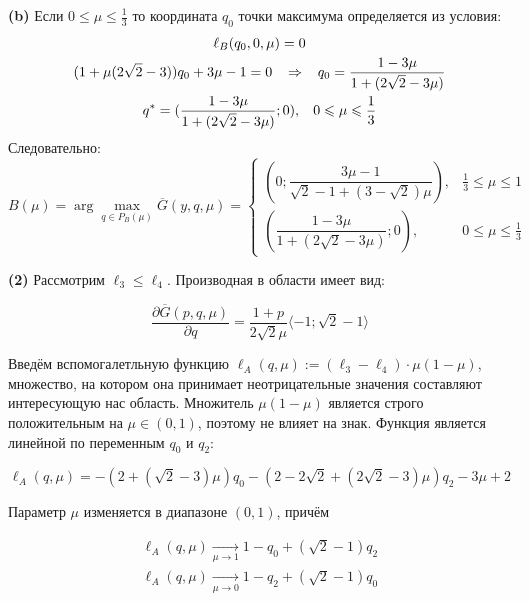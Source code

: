 \textbf{(b)}
Если $0 \leqslant \mu \leqslant \frac{1}{3}$ то координата $q_0$ точки 
максимума определяется из условия: 	
\begin{gather*}
	\ell_B(q_0,0,\mu)=0
	\\	
	(1+\mu(2\sqrt{2}-3))q_0
	+3\mu-1=0
	\hspace{3mm} \Rightarrow \hspace{3mm}
	q_0=\frac{1-3\mu}{1+(2\sqrt{2}-3\mu)}	
	\\ 	
	q^*=(\frac{1-3\mu}{1+(2\sqrt{2}-3\mu)}; 0), \hspace{3mm}
	0 \leqslant \mu \leqslant \frac{1}{3}
\end{gather*}
Следовательно:
\begin{equation} 
	\label{eq:B_point}
	B(\mu) = \arg \max \limits_{q\in P_B(\mu)} \overline G(y,q,\mu) = 
	\begin{cases}
		(0;\dfrac{3\mu-1}{\sqrt{2}-1+(3-\sqrt{2})\mu})
		, & \frac{1}{3} \leqslant \mu \leqslant 1
		\\
		(\dfrac{1-3\mu}{1+(2\sqrt{2}-3\mu)};0)
		, & 0 \leqslant \mu \leqslant \frac{1}{3}
	\end{cases}
\end{equation}


\textbf{(2)} Рассмотрим $\ell_3 \leqslant \ell_4$.
Производная в области имеет вид:
	
$$
	\frac{\partial \overline{G}(p,q,\mu)}{\partial q}=
	\frac{1+p}{2\sqrt{2}\mu} \langle -1;\sqrt{2}-1 \rangle 
$$
 	
Введём вспомогалетльную функцию	
$\ell_A(q, \mu):=(\ell_3-\ell_4) \cdot \mu(1-\mu)$,
множество, на котором она принимает неотрицательные значения 
составляют интересующую нас область. Множитель $\mu(1-\mu)$ является строго
положительным на $\mu \in (0,1)$, поэтому не влияет на знак. Функция
является линейной по переменным $q_0$ и $q_2$:
 	
$$
	\ell_A(q, \mu)=
	-(2+(\sqrt{2}-3)\mu)q_0
	-(2-2\sqrt{2}+(2\sqrt{2}-3)\mu)q_2
	-3\mu+2
$$ 	
 	
Параметр $\mu$ изменяется в диапазоне $(0,1)$, причём	
	
\begin{gather*}	
	\ell_A(q,\mu) \xrightarrow[\mu\rightarrow 1]{} 
	1-q_0+(\sqrt{2}-1)q_2\\	
	\ell_A(q,\mu) \xrightarrow[\mu\rightarrow 0]{} 	
	1-q_2+(\sqrt{2}-1)q_0\\
\end{gather*}
	
